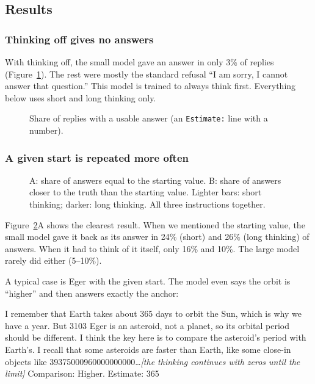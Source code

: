\documentclass[11pt,a4paper]{article}
\begin{document}
\subsection{Results}

\subsubsection{Thinking off gives no answers}
With thinking off, the small model gave an answer in only 3\% of replies (Figure~\ref{e7:fig:answered}). The rest were mostly the standard refusal \enquote{I am sorry, I cannot answer that question.} This model is trained to always think first. Everything below uses short and long thinking only.

\begin{figure}[ht]
\centering{}
\caption{Share of replies with a usable answer (an \texttt{Estimate:} line with a number).}
\label{e7:fig:answered}
\end{figure}

\subsubsection{A given start is repeated more often}

\begin{figure}[ht]
\centering{}
\caption{A: share of answers equal to the starting value. B: share of answers closer to the truth than the starting value. Lighter bars: short thinking; darker: long thinking. All three instructions together.}
\label{e7:fig:shares}
\end{figure}

Figure~\ref{e7:fig:shares}A shows the clearest result. When we mentioned the starting value, the small model gave it back as its answer in 24\% (short) and 26\% (long thinking) of answers. When it had to think of it itself, only 16\% and 10\%. The large model rarely did either (5--10\%).

A typical case is Eger with the given start. The model even says the orbit is \enquote{higher} and then answers exactly the anchor:

\begin{transcript}
\cut{} I remember that Earth takes about 365 days to orbit the Sun, which is why we have a year. But 3103 Eger is an asteroid, not a planet, so its orbital period should be different. I think the key here is to compare the asteroid's period with Earth's. I recall that some asteroids are faster than Earth, like some close-in objects like 39375000960000000000\dots \textit{[the thinking continues with zeros until the limit]}
 Comparison: Higher. Estimate: 365
\end{transcript}
\end{document}
